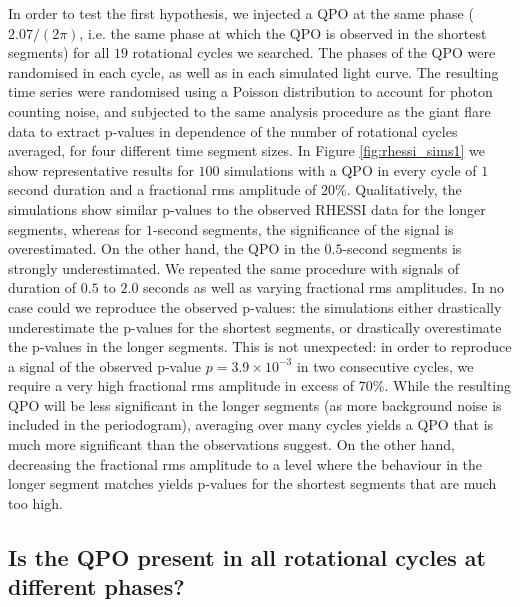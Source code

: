 \documentclass{emulateapj}
\begin{document}
In order to test the first hypothesis, we injected a QPO at the same phase ($2.07/(2\pi)$, i.e. the same phase at which the QPO is observed in the shortest segments) for all $19$ rotational cycles we searched. The phases of the QPO were randomised in each cycle, as well as in each simulated light curve. The resulting time series were randomised using a Poisson distribution to account for photon counting noise, and subjected to the same analysis procedure as the giant flare data to extract p-values in dependence of the number of rotational cycles averaged, for four different time segment sizes. 
In Figure \ref{fig:rhessi_sims1} we show representative results for $100$ simulations with a QPO in every cycle of $1$ second duration and a fractional rms amplitude of $20\%$. Qualitatively, the simulations show similar p-values to the observed RHESSI data for the longer segments, whereas for $1$-second segments, the significance of the signal is overestimated. On the other hand, the QPO in the $0.5$-second segments is strongly underestimated. 
We repeated the same procedure with signals of duration of $0.5$ to $2.0$ seconds as well as varying fractional rms amplitudes. In no case could we reproduce the observed p-values: the simulations either drastically underestimate the p-values for the shortest segments, or drastically overestimate the p-values in the longer segments. 
This is not unexpected: in order to reproduce a signal of the observed p-value $p = 3.9 \times 10^{-3}$ in two consecutive cycles, we require a very high fractional rms amplitude in excess of $70\%$. While the resulting QPO will be less significant in the longer segments (as more background noise is included in the periodogram), averaging over many cycles yields a QPO that is much more significant than the observations suggest. On the other hand, decreasing the fractional rms amplitude to a level where the behaviour in the longer segment matches yields p-values for the shortest segments that are much too high. 

 
\subsection{Is the QPO present in all rotational cycles at different phases?}
\end{document}
